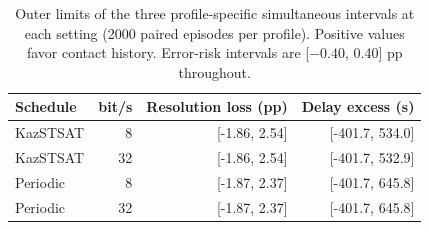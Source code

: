 \begin{table}[!htb]\centering\small
\caption{Outer limits of the three profile-specific simultaneous intervals at each setting (2000 paired episodes per profile). Positive values favor contact history. Error-risk intervals are [$-0.40$, 0.40] pp throughout.}\label{tab:validation}
\begin{tabular}{@{}lrrr@{}}\toprule
Schedule & bit/s & Resolution loss (pp) & Delay excess (s)\\\midrule
KazSTSAT & 8 & [-1.86, 2.54] & [-401.7, 534.0]\\
KazSTSAT & 32 & [-1.86, 2.54] & [-401.7, 532.9]\\
Periodic & 8 & [-1.87, 2.37] & [-401.7, 645.8]\\
Periodic & 32 & [-1.87, 2.37] & [-401.7, 645.8]\\
\bottomrule\end{tabular}\end{table}
